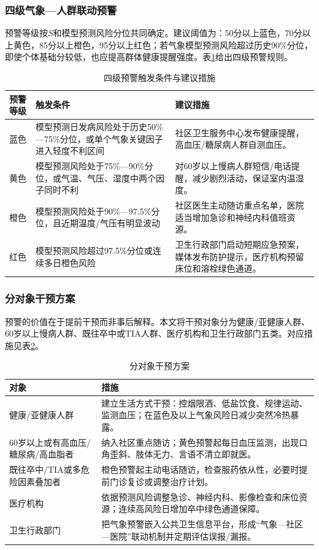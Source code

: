 \documentclass[UTF8,a4paper,12pt]{ctexart}
\begin{document}
\subsubsection{四级气象—人群联动预警}
预警等级按$S$和模型预测风险分位共同确定。建议阈值为：50分以上蓝色，70分以上黄色，85分以上橙色，95分以上红色；若气象模型预测风险超过历史90\%分位，即使个体基础分较低，也应提高群体健康提醒强度。表\ref{tab:rules}给出四级预警规则。
\begin{table}[H]\centering\caption{四级预警触发条件与建议措施}\label{tab:rules}
\begin{tabular}{lll}
\toprule
预警等级 & 触发条件 & 建议措施 \\
\midrule
蓝色 & 模型预测日发病风险处于历史50\%—75\%分位，或单个气象关键因子进入轻度不利区间 & 社区卫生服务中心发布健康提醒，高血压/糖尿病人群自测血压。 \\
黄色 & 模型预测风险处于75\%—90\%分位，或气温、气压、湿度中两个因子同时不利 & 对60岁以上慢病人群短信/电话提醒，减少剧烈活动，保证室内温湿度。 \\
橙色 & 模型预测风险处于90\%—97.5\%分位，且近期温度/气压有明显波动 & 社区医生主动随访重点名单，医院适当增加急诊和神经内科值班资源。 \\
红色 & 模型预测风险超过97.5\%分位或连续多日橙色风险 & 卫生行政部门启动短期应急预案，媒体发布防护提示，医疗机构预留床位和溶栓绿色通道。 \\
\bottomrule
\end{tabular}
\end{table}

\subsubsection{分对象干预方案}
预警的价值在于提前干预而非事后解释。本文将干预对象分为健康/亚健康人群、60岁以上慢病人群、既往卒中或TIA人群、医疗机构和卫生行政部门五类。对应措施见表\ref{tab:inter}。
\begin{table}[H]\centering\caption{分对象干预方案}\label{tab:inter}
\begin{tabular}{ll}
\toprule
对象 & 措施 \\
\midrule
健康/亚健康人群 & 建立生活方式干预：控烟限酒、低盐饮食、规律运动、监测血压；在蓝色及以上气象风险日减少突然冷热暴露。 \\
60岁以上或有高血压/糖尿病/高血脂者 & 纳入社区重点随访；黄色预警起每日血压监测，出现口角歪斜、肢体无力、言语不清立即就医。 \\
既往卒中/TIA或多危险因素叠加者 & 橙色预警起主动电话随访，检查服药依从性，必要时提前门诊复诊或调整治疗计划。 \\
医疗机构 & 依据预测风险调整急诊、神经内科、影像检查和床位资源；连续高风险日增加卒中绿色通道保障。 \\
卫生行政部门 & 把气象预警嵌入公共卫生信息平台，形成“气象—社区—医院”联动机制并定期评估误报/漏报。 \\
\bottomrule
\end{tabular}
\end{table}
\end{document}
